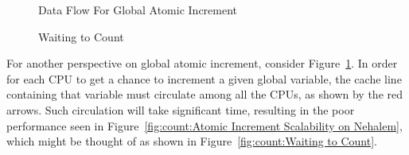 \begin{figure}[tb]
\begin{center}
\end{center}
\caption{Data Flow For Global Atomic Increment}
\label{fig:count:Data Flow For Global Atomic Increment}
\end{figure}

\begin{figure}[tb]
\begin{center}
\end{center}
\caption{Waiting to Count}
\end{figure}

For another perspective on global atomic increment, consider
Figure~\ref{fig:count:Data Flow For Global Atomic Increment}.
In order for each CPU to get a chance to increment a given
global variable, the cache line containing that variable must
circulate among all the CPUs, as shown by the red arrows.
Such circulation will take significant time, resulting in
the poor performance seen in
Figure~\ref{fig:count:Atomic Increment Scalability on Nehalem},
which might be thought of as shown in
Figure~\ref{fig:count:Waiting to Count}.

